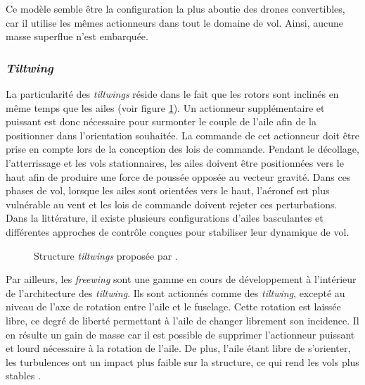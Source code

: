         Ce modèle semble être la configuration la plus aboutie des drones convertibles, car il utilise les mêmes actionneurs dans tout le domaine de vol. Ainsi, aucune masse superflue n'est embarquée.

    
        \subsubsection*{\textit{Tiltwing}} 
        La particularité des \textit{tiltwings} réside dans le fait que les rotors sont inclinés en même temps que les ailes (voir figure \ref{fig:tiltwing}). Un actionneur supplémentaire et puissant est donc nécessaire pour surmonter le couple de l'aile afin de la positionner dans l'orientation souhaitée. La commande de cet actionneur doit être prise en compte lors de la conception des lois de commande. Pendant le décollage, l'atterrissage et les vols stationnaires, les ailes doivent être positionnées vers le haut afin de produire une force de poussée opposée au vecteur gravité. Dans ces phases de vol, lorsque les ailes sont orientées vers le haut, l'aéronef est plus vulnérable au vent et les lois de commande doivent rejeter ces perturbations. Dans la littérature, il existe plusieurs configurations d'ailes basculantes et différentes approches de contrôle conçues pour stabiliser leur dynamique de vol.
        \begin{figure}[ht!]
            \centering
            \caption{Structure \textit{tiltwings}  proposée par \cite{Aero2_2024, Ostermann2012ControlCO}.}
            \label{fig:tiltwing}
        \end{figure}

        Par ailleurs, les \textit{freewing} sont une gamme en cours de développement à l'intérieur de l'architecture des \textit{tiltwing}. Ils sont actionnés comme des \textit{tiltwing}, excepté au niveau de l'axe de rotation entre l'aile et le fuselage. Cette rotation est laissée libre, ce degré de liberté permettant à l'aile de changer librement son incidence. Il en résulte un gain de masse car il est possible de supprimer l'actionneur puissant et lourd nécessaire à la rotation de l'aile. De plus, l'aile étant libre de s'orienter, les turbulences ont un impact plus faible sur la structure, ce qui rend les vols plus stables \cite{freewing2012, Johnson2021, Johnson2023}. 


